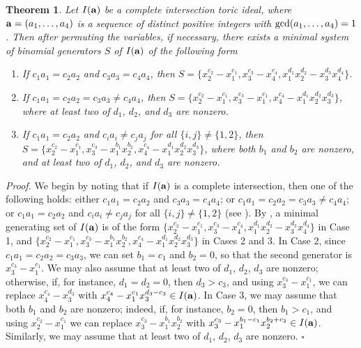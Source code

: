 \documentclass[10pt]{amsart}
\newtheorem{thm1}{Theorem}[section]
\begin{document}
\begin{thm1} \label{CasesMinimal} Let $I({\bf a})$ be a complete intersection toric ideal, where ${\bf a}=(a_1,\ldots,a_4)$ is a sequence of distinct positive integers with ${\rm gcd}(a_1,\ldots,a_4)=1$. Then after permuting the variables, if necessary, there exists a minimal system of binomial generators $S$ of $I({\bf a})$ of the following form \begin{enumerate} \item[{\rm CASE 1:}] If $c_{1}a_{1}=c_{2}a_{2}$ and $c_{3}a_{3}=c_{4}a_{4}$, then $S=\{x_{2}^{c_2}-x_{1}^{c_1}, x_{3}^{c_3}-x_{4}^{c_4}, x_{1}^{d_1}x_{2}^{d_2}-x_{3}^{d_3}x_{4}^{d_4}\}$. \item[{\rm CASE 2:}] If $c_{1}a_{1}=c_{2}a_{2}=c_{3}a_{3} \neq c_{4}a_{4}$, then $S=\{x_{2}^{c_2}-x_{1}^{c_1}, x_{3}^{c_3}-x_{1}^{c_1}, x_{4}^{c_4}-x_{1}^{d_1}x_{2}^{d_2}x_{3}^{d_3}\}$, where at least two of $d_1$, $d_2$, and $d_3$ are nonzero. \item[{\rm CASE 3:}] If $c_{1}a_{1}=c_{2}a_{2}$ and $c_{i}a_{i} \neq c_{j}a_{j}$ for all $\{i,j\} \neq \{1,2\}$, then $S=\{x_{2}^{c_2}-x_{1}^{c_1}, x_{3}^{c_3}-x_{1}^{b_1}x_{2}^{b_2}, x_{4}^{c_4}-x_{1}^{d_1}x_{2}^{d_2}x_{3}^{d_3}\}$, where both $b_1$ and $b_2$ are nonzero, and at least two of $d_1$, $d_2$, and $d_3$ are nonzero.
\end{enumerate}
\end{thm1}

{\em \noindent Proof.} We begin by noting that if $I({\bf a})$ is a complete intersection, then one of the following holds: either $c_1a_1=c_2a_2$ and $c_3a_3=c_4a_4$; or $c_{1}a_{1}=c_{2}a_{2}=c_{3}a_{3} \neq c_{4}a_{4}$; or $c_{1}a_{1}=c_{2}a_{2}$ and $c_{i}a_{i} \neq c_{j}a_{j}$ for all $\{i,j\} \neq \{1,2\}$ (see \cite{KO}). By \cite[Proposition 3.2]{Shi}, a minimal generating set of $I({\bf a})$ is of the form $\{x_{2}^{c_2}-x_{1}^{c_1}, x_{3}^{c_3}-x_{4}^{c_4}, x_{1}^{d_1}x_{2}^{d_2}-x_{3}^{d_3}x_{4}^{d_4}\}$ in Case 1, and $\{x_{2}^{c_2}-x_{1}^{c_1}, x_{3}^{c_3}-x_{1}^{b_1}x_{2}^{b_2}, x_{4}^{c_4}-x_{1}^{d_1}x_{2}^{d_2}x_{3}^{d_3}\}$ in Cases 2 and 3. In Case 2, since $c_{1}a_1=c_{2}a_2=c_{3}a_{3}$, we can set $b_{1}=c_1$ and $b_2=0$, so that the second generator is $x_{3}^{c_3}-x_{1}^{c_1}$. We may also assume that at least two of $d_1$, $d_2$, $d_3$ are nonzero; otherwise, if, for instance, $d_{1}=d_{2}=0$, then $d_{3}>c_3$, and using $x_{3}^{c_3}-x_{1}^{c_1}$, we can replace $x_{4}^{c_4}-x_{3}^{d_3}$ with $x_{4}^{c_4}-x_{1}^{c_1}x_{3}^{d_3-c_3} \in I({\bf a})$. In Case 3, we may assume that both $b_1$ and $b_2$ are nonzero; indeed, if, for instance, $b_2=0$, then $b_1>c_1$, and using $x_2^{c_2}-x_1^{c_1}$ we can replace $x_3^{c_3} - x_1^{b_1}x_2^{b_2}$ with $x_3^{c_3}-x_1^{b_1-c_1}x_2^{b_2+c_2} \in I({\bf a})$. Similarly, we may assume that at least two of $d_1$, $d_2$, $d_3$ are nonzero. \hfill $\square$ \par\vspace{0.5\baselineskip}
\end{document}
